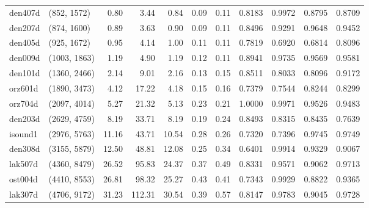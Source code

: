 \begin{tabular}{llrrrrrrrrr}
 den407d &  (852, 1572) &  0.80 &   3.44 &  0.84 &  0.09 &   0.11 &   0.8183 &   0.9972 &     0.8795 &      0.8709 \\
 den207d &  (874, 1600) &  0.89 &   3.63 &  0.90 &  0.09 &   0.11 &   0.8496 &   0.9291 &     0.9648 &      0.9452 \\
 den405d &  (925, 1672) &  0.95 &   4.14 &  1.00 &  0.11 &   0.11 &   0.7819 &   0.6920 &     0.6814 &      0.8096 \\
 den009d & (1003, 1863) &  1.19 &   4.90 &  1.19 &  0.12 &   0.11 &   0.8941 &   0.9735 &     0.9569 &      0.9581 \\
 den101d & (1360, 2466) &  2.14 &   9.01 &  2.16 &  0.13 &   0.15 &   0.8511 &   0.8033 &     0.8096 &      0.9172 \\
 orz601d & (1890, 3473) &  4.12 &  17.22 &  4.18 &  0.15 &   0.16 &   0.7379 &   0.7544 &     0.8244 &      0.8299 \\
 orz704d & (2097, 4014) &  5.27 &  21.32 &  5.13 &  0.23 &   0.21 &   1.0000 &   0.9971 &     0.9526 &      0.9483 \\
 den203d & (2629, 4759) &  8.19 &  33.71 &  8.19 &  0.19 &   0.24 &   0.8493 &   0.8315 &     0.8435 &      0.7639 \\
 isound1 & (2976, 5763) & 11.16 &  43.71 & 10.54 &  0.28 &   0.26 &   0.7320 &   0.7396 &     0.9745 &      0.9749 \\
 den308d & (3155, 5879) & 12.50 &  48.81 & 12.08 &  0.25 &   0.34 &   0.6401 &   0.9914 &     0.9329 &      0.9067 \\
 lak507d & (4360, 8479) & 26.52 &  95.83 & 24.37 &  0.37 &   0.49 &   0.8331 &   0.9571 &     0.9062 &      0.9713 \\
 ost004d & (4410, 8553) & 26.81 &  98.32 & 25.27 &  0.43 &   0.41 &   0.7343 &   0.9929 &     0.8822 &      0.9365 \\
 lak307d & (4706, 9172) & 31.23 & 112.31 & 30.54 &  0.39 &   0.57 &   0.8147 &   0.9783 &     0.9045 &      0.9728 \\
\bottomrule
\end{tabular}
